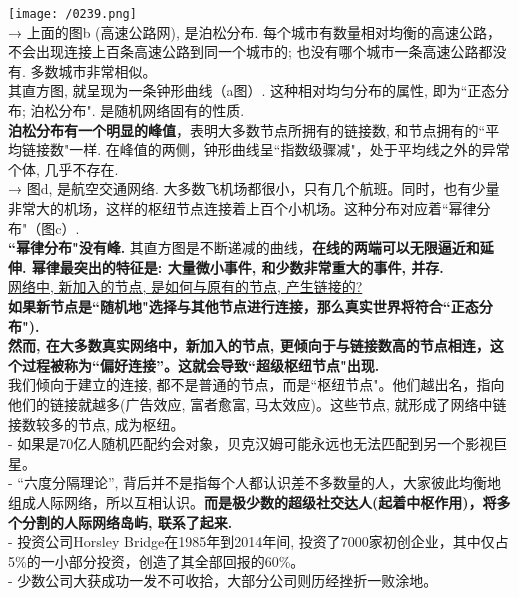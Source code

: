 \documentclass[UTF8]{ctexart}
\begin{document}
	
	
	\begin{myEnvSample}
\texttt{[image: /0239.png]} \\

→ 上面的图b (高速公路网), 是泊松分布. 每个城市有数量相对均衡的高速公路，不会出现连接上百条高速公路到同一个城市的; 也没有哪个城市一条高速公路都没有. 多数城市非常相似。 \\
其直方图, 就呈现为一条钟形曲线（a图）. 这种相对均匀分布的属性, 即为``正态分布; 泊松分布". 是随机网络固有的性质. \\

\textbf{泊松分布有一个明显的峰值}，表明大多数节点所拥有的链接数, 和节点拥有的``平均链接数"一样. 在峰值的两侧，钟形曲线呈``指数级骤减"，处于平均线之外的异常个体, 几乎不存在. \\

→ 图d, 是航空交通网络. 大多数飞机场都很小，只有几个航班。同时，也有少量非常大的机场，这样的枢纽节点连接着上百个小机场。这种分布对应着``幂律分布"（图c）. \\

		
	\textbf{``幂律分布"没有峰.} 其直方图是不断递减的曲线，\textbf{在线的两端可以无限逼近和延伸. 幂律最突出的特征是: 大量微小事件, 和少数非常重大的事件, 并存.} \\
	
	
	
	\underline{网络中, 新加入的节点, 是如何与原有的节点, 产生链接的? } \\	
	\textbf{如果新节点是``随机地"选择与其他节点进行连接，那么真实世界将符合``正态分布").} \\
	\textbf{然而, 在大多数真实网络中，新加入的节点, 更倾向于与链接数高的节点相连，这个过程被称为``偏好连接”。这就会导致``超级枢纽节点"出现.} \\
	我们倾向于建立的连接, 都不是普通的节点，而是``枢纽节点"。他们越出名，指向他们的链接就越多(广告效应, 富者愈富, 马太效应)。这些节点, 就形成了网络中链接数较多的节点, 成为枢纽。 \\
	
	- 如果是70亿人随机匹配约会对象，贝克汉姆可能永远也无法匹配到另一个影视巨星。 \\
	- ``六度分隔理论”, 背后并不是指每个人都认识差不多数量的人，大家彼此均衡地组成人际网络，所以互相认识。\textbf{而是极少数的超级社交达人(起着中枢作用)，将多个分割的人际网络岛屿, 联系了起来.} \\
	- 投资公司Horsley Bridge在1985年到2014年间, 投资了7000家初创企业，其中仅占5\%的一小部分投资，创造了其全部回报的60\%。 \\
	- 少数公司大获成功一发不可收拾，大部分公司则历经挫折一败涂地。 
		\end{myEnvSample}
	
\end{document}
